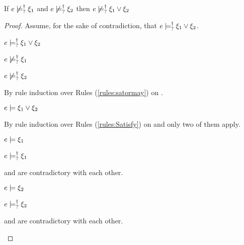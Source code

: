 \begin{lem}
  \label{lem:or-nn-satisfy}
  If $e \not\models_{?}^{\dag} \xi_1$ and $e \not\models_{?}^{\dag} \xi_2$ then $e \not\models_{?}^{\dag} \xi_1 \vee \xi_2$
\end{lem}
\begin{proof}
  Assume, for the sake of contradiction, that $e \models_{?}^{\dag} \xi_1 \vee \xi_2$.
\begin{pfsteps*}
\item $e \models_{?}^{\dag} \xi_1 \vee \xi_2$  
\item $e \not\models_{?}^{\dag} \xi_1$  
\item $e \not\models_{?}^{\dag} \xi_2$  
\end{pfsteps*}
By rule induction over Rules (\ref{rules:satormay}) on .
\begin{byCases}
\item[\text{(\ref{rule:CMSMust})}]
  \begin{pfsteps*}
  \item $e \models \xi_1 \vee \xi_2$  
  \end{pfsteps*}
  By rule induction over Rules (\ref{rules:Satisfy}) on  and only two of them apply.
  \begin{byCases}

  \item[\text{(\ref{rule:CSOr1})}]
    \begin{pfsteps*}
    \item $e \models \xi_1$  
    \item $e \models_{?}^{\dag} \xi_1$  
    \end{pfsteps*}
     and  are contradictory with each other.

  \item[\text{(\ref{rule:CSOr2})}]
    \begin{pfsteps*}
    \item $e \models \xi_2$  
    \item $e \models_{?}^{\dag} \xi_2$  
    \end{pfsteps*}
     and  are contradictory with each other.


\end{byCases}
\end{byCases}
\end{proof}
